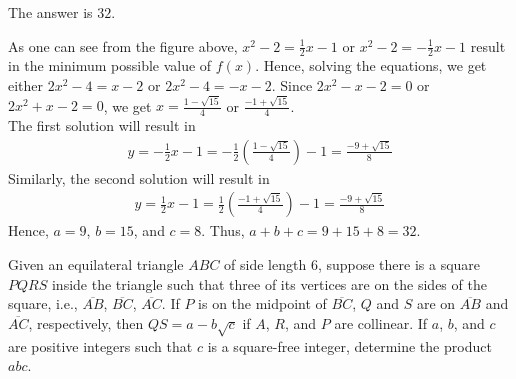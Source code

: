 \begin{solution}
The answer is $32$.\\
	\begin{center}
	\end{center}
As one can see from the figure above, $x^2-2=\frac{1}{2}x-1$ or $x^2-2=-\frac{1}{2}x-1$ result in the minimum possible value of $f(x)$. Hence, solving the equations, we get either $2x^2-4=x-2$ or $2x^2-4=-x-2$. Since $2x^2-x-2=0$ or $2x^2+x-2=0$, we get $x=\frac{1-\sqrt{15}}{4}$ or $\frac{-1+\sqrt{15}}{4}$.\\
\bigskip
The first solution will result in 
\begin{align*}
	y=-\frac{1}{2}x-1=-\frac{1}{2}\left(\frac{1-\sqrt{15}}{4}\right)-1=\frac{-9+\sqrt{15}}{8}
\end{align*}
Similarly, the second solution will result in 
\begin{align*}
	y=\frac{1}{2}x-1=\frac{1}{2}\left( \frac{-1+\sqrt{15}}{4} \right) -1 = \frac{-9+\sqrt{15}}{8}
\end{align*}
Hence, $a=9$, $b=15$, and $c=8$. Thus, $a+b+c=9+15+8=32$.\\
\end{solution}

\begin{problem}
Given an equilateral triangle $ABC$ of side length $6$, suppose there is a square $PQRS$ inside the triangle such that three of its vertices are on the sides of the square, i.e., $\overline{AB}$, $\overline{BC}$, $\overline{AC}$. If $P$ is on the midpoint of $\overline{BC}$, $Q$ and $S$ are on $\overline{AB}$ and $\overline{AC}$, respectively, then $QS=a-b\sqrt{c}$ if $A$, $R$, and $P$ are collinear. If $a$, $b$, and $c$ are positive integers such that $c$ is a square-free integer, determine the product $abc$.\\
\end{problem}

